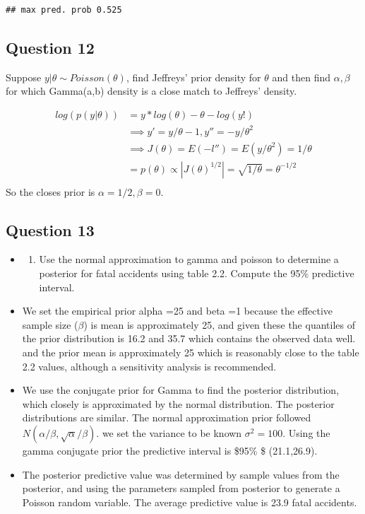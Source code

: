 \documentclass[
]{book}
\providecommand{\tightlist}{%
  \setlength{\itemsep}{0pt}\setlength{\parskip}{0pt}}
\theoremstyle{definition}
\theoremstyle{definition}
\theoremstyle{definition}
\theoremstyle{definition}
\theoremstyle{remark}
\begin{document}
\begin{verbatim}
## max pred. prob 0.525
\end{verbatim}

\hypertarget{question-12}{%
\subsection*{Question 12}\label{question-12}}

Suppose \(y|\theta \sim Poisson(\theta)\), find Jeffreys' prior density for \(\theta\) and then find \(\alpha,\beta\) for which Gamma(a,b) density is a close match to Jeffreys' density.

\[
\begin{aligned}
 log(p(y|\theta))&= y*log(\theta)-\theta -log(y!)\\
 &\implies y' = y/\theta - 1 ,  y'' = -y/\theta^2 \\
 &\implies J(\theta)= E(- l'')= E(y/\theta^2)= 1/\theta \\
 &= p(\theta)\propto |J(\theta)^{1/2}| = \sqrt{1/\theta} = \theta^{-1/2}\\
\end{aligned}
\]
So the closes prior is \(\alpha=1/2 , \beta=0\).

\hypertarget{question-13}{%
\subsection*{Question 13}\label{question-13}}

\begin{itemize}
\item
  \begin{enumerate}
  \def\labelenumi{(\alph{enumi})}
  \tightlist
  \item
    Use the normal approximation to gamma and poisson to determine a posterior for fatal accidents using table 2.2. Compute the 95\(\%\) predictive interval.
  \end{enumerate}
\item
  We set the empirical prior alpha =25 and beta =1 because the effective sample size (\(\beta\)) is mean is approximately 25, and given these the quantiles of the prior distribution is 16.2 and 35.7 which contains the observed data well. and the prior mean is approximately 25 which is reasonably close to the table 2.2 values, although a sensitivity analysis is recommended.
\item
  We use the conjugate prior for Gamma to find the posterior distribution, which closely is approximated by the normal distribution. The posterior distributions are similar. The normal approximation prior followed \(N(\alpha/\beta, \sqrt{\alpha}/\beta)\). we set the variance to be known \(\sigma^2=100\). Using the gamma conjugate prior the predictive interval is \$95\% \$ (21.1,26.9).
\item
  The posterior predictive value was determined by sample values from the posterior, and using the parameters sampled from posterior to generate a Poisson random variable. The average predictive value is 23.9 fatal accidents.
\end{itemize}
\end{document}
